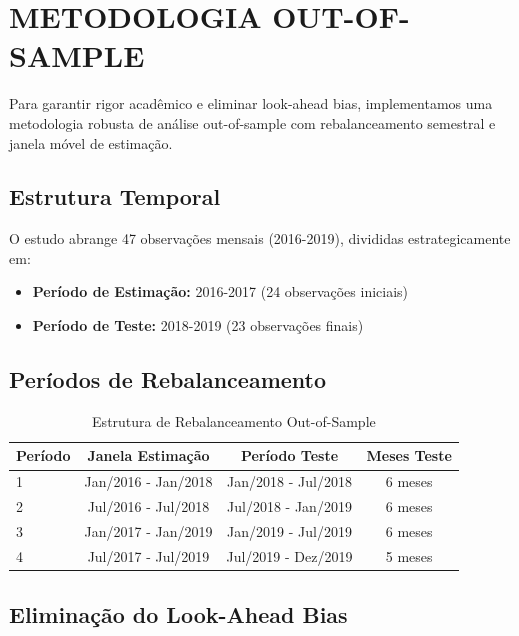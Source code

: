 \section{METODOLOGIA OUT-OF-SAMPLE}

Para garantir rigor acadêmico e eliminar look-ahead bias, implementamos uma metodologia robusta de análise out-of-sample com rebalanceamento semestral e janela móvel de estimação.

\subsection{Estrutura Temporal}

O estudo abrange 47 observações mensais (2016-2019), divididas estrategicamente em:
\begin{itemize}
    \item \textbf{Período de Estimação:} 2016-2017 (24 observações iniciais)
    \item \textbf{Período de Teste:} 2018-2019 (23 observações finais)
\end{itemize}

\subsection{Períodos de Rebalanceamento}

\begin{table}[H]
\centering
\caption{Estrutura de Rebalanceamento Out-of-Sample}
\begin{tabular}{lccc}
\toprule
\textbf{Período} & \textbf{Janela Estimação} & \textbf{Período Teste} & \textbf{Meses Teste} \\
\midrule
1 & Jan/2016 - Jan/2018 & Jan/2018 - Jul/2018 & 6 meses \\
2 & Jul/2016 - Jul/2018 & Jul/2018 - Jan/2019 & 6 meses \\
3 & Jan/2017 - Jan/2019 & Jan/2019 - Jul/2019 & 6 meses \\
4 & Jul/2017 - Jul/2019 & Jul/2019 - Dez/2019 & 5 meses \\
\bottomrule
\end{tabular}
\label{tab:rebalanceamento}
\end{table}

\subsection{Eliminação do Look-Ahead Bias}

